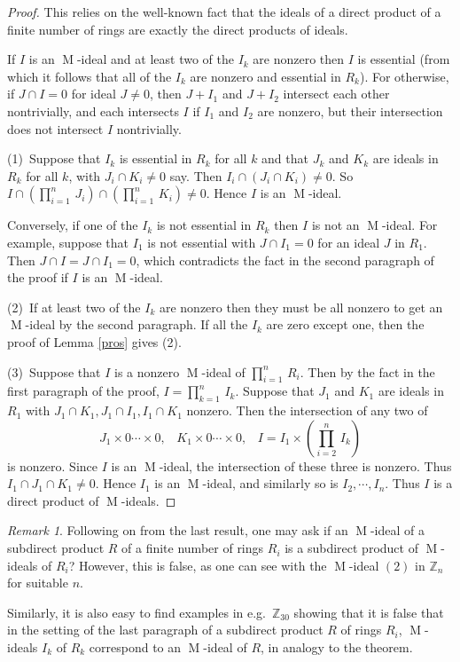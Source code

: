 \documentclass[11pt,leqno]{amsart}
\DeclareMathOperator{\m}{M}
\theoremstyle{definition}
\theoremstyle{remark}
\newtheorem{remark}[theorem]{Remark}
\numberwithin{equation}{section}
\numberwithin{equation}{section}
\begin{document}
\begin{proof}  This relies on the well-known fact that the ideals of a direct product of a finite number of rings are exactly the direct products of
ideals.   
 
If $I$ is an $\m$-ideal and at least two of the $I_k$ are nonzero then $I$ is essential (from which it follows that all of the $I_k$ are nonzero and essential in $R_k$). 
For otherwise, if $J \cap I= 0$ for  ideal $J \neq 0$,
then $J + I_1$ and $J + I_2$ intersect each other nontrivially, and each intersects $I$ if $I_1$ and $I_2$ are
nonzero, but
their intersection does not  intersect $I$ nontrivially.  
 
(1)\ Suppose that $I_k$ is essential in $R_k$ for all $k$ and that
$J_k$ and $K_k$ are ideals  in $R_k$ for all $k$, with $J_i \cap K_i \neq 0$ say.  Then
$I_i \cap (J_i \cap K_i) \neq 0$.  So $I \cap (\prod_{i=1}^n \, J_i) \cap (\prod_{i=1}^n \, K_i) \neq 0$. Hence
$I$ is an $\m$-ideal.
 
Conversely, if one of the $I_k$ is not essential in $R_k$
then $I$ is not an $\m$-ideal.  For example, suppose that $I_1$ is not essential
with  $J \cap I_1 = 0$ for an ideal $J$ in $R_1$. Then $J \cap I = J \cap I_1 = 0$,
which contradicts the fact in the second paragraph of the proof if $I$ is an $\m$-ideal.

(2)\ If at least two of the $I_k$ are nonzero  then  they must be all nonzero to get an  $\m$-ideal
by the second paragraph.   If all the $I_k$ are zero except one, then 
the proof of  Lemma \ref{pros} gives (2). 

 
(3)\ Suppose that $I$  is a nonzero $\m$-ideal of $\prod_{i=1}^n \, 
R_i$.  Then by the fact in the first paragraph of the proof,
 $I =  \prod_{k=1}^n \, I_k$.
Suppose that $J_1$ and $K_1$ are ideals in $R_1$ with $J_1 \cap K_1, J_1 \cap I_1, I_1 \cap K_1$ nonzero.  Then the intersection of any two of
\[J_1\times 0\cdots\times 0,\; \; \; K_1 \times 0\cdots\times 0, \; \; \; I = I_1 \times \left(\prod_{i=2}^n \, I_k\right)\]
is nonzero.
Since $I$ is an $\m$-ideal, the intersection of these three is nonzero.  Thus $I_1 \cap J_1 \cap K_1 \neq 0$.
Hence $I_1$ is an $\m$-ideal, and similarly so is $I_2, \cdots, I_n$. Thus $I$ is a direct product of $\m$-ideals. 
\end{proof}

\begin{remark}  \label{sdp} Following on from the last result, one may ask if an $\m$-ideal of a subdirect product $R$ of a finite number of rings $R_i$ is a subdirect product of $\m$-ideals of $R_i$?   However, this is false,  as one can see with 
 the $\m$-ideal $(2)$ in $\mathds{Z}_n$ for suitable $n$.


Similarly, it is also easy    to find examples in e.g.\ $\mathds{Z}_{30}$ showing that it is false that in the setting of the last paragraph of a subdirect product $R$ of rings $R_i$,   $\m$-ideals $I_k$ of $R_k$ correspond to an $\m$-ideal of $R$, in analogy to the theorem. \end{remark}
\end{document}
